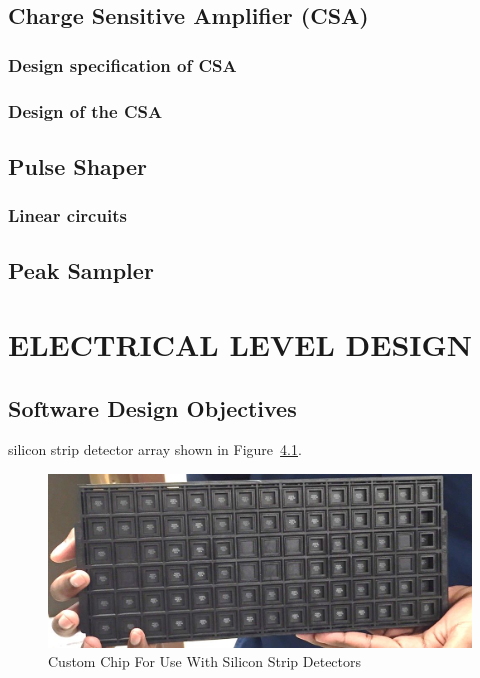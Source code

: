 \documentclass[12pt,oneside,final]{siuethesis}
\theoremstyle{definition}
\begin{document}
\section{Charge Sensitive Amplifier (CSA)}

\subsection{Design specification of CSA}

\subsection{Design of the CSA}

\section{Pulse Shaper}

\subsection{Linear circuits}

\section{Peak Sampler}



\chapter{ELECTRICAL LEVEL DESIGN}

\section{Software Design Objectives}

silicon strip detector array shown in Figure~\ref{FIG:PACKAGED_PARTS}.
\begin{figure}[htbp!]
\centering
\includegraphics[scale=.4,keepaspectratio=true]{./ch3_figures/packaged_parts.png} 
\caption{Custom Chip For Use With 
Silicon Strip Detectors}
\label{FIG:PACKAGED_PARTS}
\end{figure}
\end{document}
